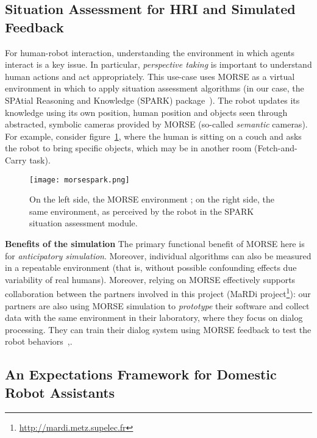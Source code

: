 \documentclass{llncs}
\begin{document}
\subsection{Situation Assessment for HRI and Simulated Feedback}
\label{sc:assessment}

For human-robot interaction, understanding the environment in which
agents interact is a key issue. In particular, \emph{perspective taking}
is important to understand human actions and act appropriately. 
This use-case uses MORSE as a virtual environment in which to apply situation 
assessment algorithms (in our case, the SPAtial Reasoning and Knowledge
(SPARK) package~\cite{Milliez2014}). The robot updates its knowledge using its 
own position, human position and objects seen through abstracted, symbolic cameras 
provided by MORSE (so-called \emph{semantic} cameras). For example, consider 
figure~\ref{fig|spark}, where the human is sitting on a couch and asks the robot to
bring specific objects, which may be in another room (Fetch-and-Carry task).

\begin{figure}[t]
      \centering
      \texttt{[image: morsespark.png]}
      \caption{On the left side, the MORSE environment ; on the right side, the same
      environment, as perceived by the robot in the SPARK situation assessment
      module.}
      \label{fig|spark}
\end{figure}

\textbf{Benefits of the simulation} The primary functional benefit of MORSE here 
is for \emph{anticipatory simulation}. Moreover, individual algorithms can also be measured 
in a repeatable environment (that is, without possible confounding effects due variability
of real humans). 
Moreover, relying on MORSE effectively supports collaboration between the partners 
involved in this project (MaRDi project\footnote{\url{http://mardi.metz.supelec.fr}}): 
our partners are also
using MORSE simulation to \emph{prototype} their software and collect data with the same
environment in their laboratory, where they focus on dialog processing. They can
train their dialog system using MORSE feedback to test the robot behaviors~\cite{simparmardi2014},.

\subsection{An Expectations Framework for Domestic Robot Assistants}
\label{sc:expectations}
\end{document}
